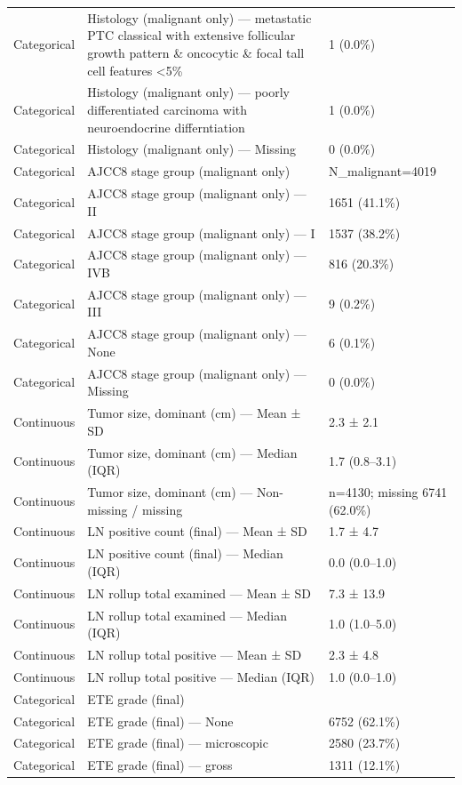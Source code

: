 \begin{table}[htbp]
\begin{tabular}{lll}
Categorical & Histology (malignant only) — metastatic PTC classical with extensive follicular growth pattern \& oncocytic \& focal tall cell features <5\% & 1 (0.0\%) \\
Categorical & Histology (malignant only) — poorly differentiated carcinoma with neuroendocrine differntiation & 1 (0.0\%) \\
Categorical & Histology (malignant only) — Missing & 0 (0.0\%) \\
Categorical & AJCC8 stage group (malignant only) & N\_malignant=4019 \\
Categorical & AJCC8 stage group (malignant only) — II & 1651 (41.1\%) \\
Categorical & AJCC8 stage group (malignant only) — I & 1537 (38.2\%) \\
Categorical & AJCC8 stage group (malignant only) — IVB & 816 (20.3\%) \\
Categorical & AJCC8 stage group (malignant only) — III & 9 (0.2\%) \\
Categorical & AJCC8 stage group (malignant only) — None & 6 (0.1\%) \\
Categorical & AJCC8 stage group (malignant only) — Missing & 0 (0.0\%) \\
Continuous & Tumor size, dominant (cm) — Mean ± SD & 2.3 ± 2.1 \\
Continuous & Tumor size, dominant (cm) — Median (IQR) & 1.7 (0.8–3.1) \\
Continuous & Tumor size, dominant (cm) — Non-missing / missing & n=4130; missing 6741 (62.0\%) \\
Continuous & LN positive count (final) — Mean ± SD & 1.7 ± 4.7 \\
Continuous & LN positive count (final) — Median (IQR) & 0.0 (0.0–1.0) \\
Continuous & LN rollup total examined — Mean ± SD & 7.3 ± 13.9 \\
Continuous & LN rollup total examined — Median (IQR) & 1.0 (1.0–5.0) \\
Continuous & LN rollup total positive — Mean ± SD & 2.3 ± 4.8 \\
Continuous & LN rollup total positive — Median (IQR) & 1.0 (0.0–1.0) \\
Categorical & ETE grade (final) &  \\
Categorical & ETE grade (final) — None & 6752 (62.1\%) \\
Categorical & ETE grade (final) — microscopic & 2580 (23.7\%) \\
Categorical & ETE grade (final) — gross & 1311 (12.1\%) \\

\end{tabular}
\end{table}
